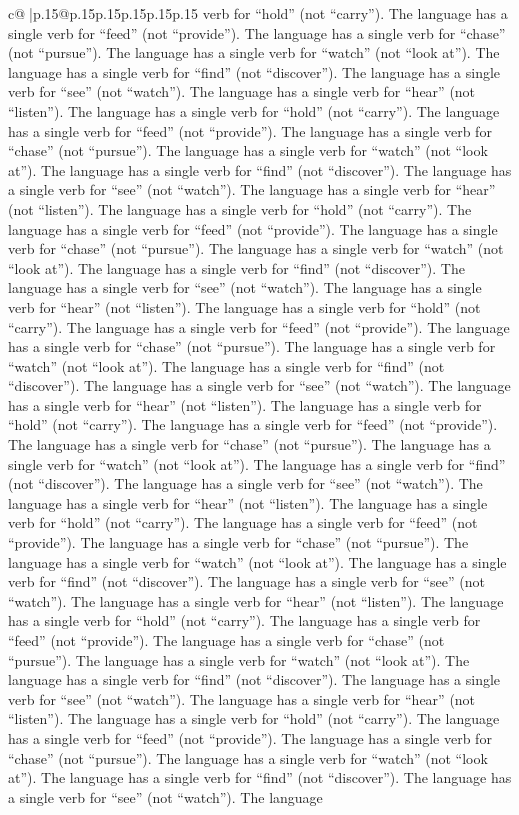\documentclass{article}
\begin{document}
{\begin{supertabular}{c@{$\;$}|p{.15\linewidth}@{}p{.15\linewidth}p{.15\linewidth}p{.15\linewidth}p{.15\linewidth}p{.15\linewidth}}
{{{verb for “hold” (not “carry”). The language has a single verb for “feed” (not “provide”). The language has a single verb for “chase” (not “pursue”). The language has a single verb for “watch” (not “look at”). The language has a single verb for “find” (not “discover”). The language has a single verb for “see” (not “watch”). The language has a single verb for “hear” (not “listen”). The language has a single verb for “hold” (not “carry”). The language has a single verb for “feed” (not “provide”). The language has a single verb for “chase” (not “pursue”). The language has a single verb for “watch” (not “look at”). The language has a single verb for “find” (not “discover”). The language has a single verb for “see” (not “watch”). The language has a single verb for “hear” (not “listen”). The language has a single verb for “hold” (not “carry”). The language has a single verb for “feed” (not “provide”). The language has a single verb for “chase” (not “pursue”). The language has a single verb for “watch” (not “look at”). The language has a single verb for “find” (not “discover”). The language has a single verb for “see” (not “watch”). The language has a single verb for “hear” (not “listen”). The language has a single verb for “hold” (not “carry”). The language has a single verb for “feed” (not “provide”). The language has a single verb for “chase” (not “pursue”). The language has a single verb for “watch” (not “look at”). The language has a single verb for “find” (not “discover”). The language has a single verb for “see” (not “watch”). The language has a single verb for “hear” (not “listen”). The language has a single verb for “hold” (not “carry”). The language has a single verb for “feed” (not “provide”). The language has a single verb for “chase” (not “pursue”). The language has a single verb for “watch” (not “look at”). The language has a single verb for “find” (not “discover”). The language has a single verb for “see” (not “watch”). The language has a single verb for “hear” (not “listen”). The language has a single verb for “hold” (not “carry”). The language has a single verb for “feed” (not “provide”). The language has a single verb for “chase” (not “pursue”). The language has a single verb for “watch” (not “look at”). The language has a single verb for “find” (not “discover”). The language has a single verb for “see” (not “watch”). The language has a single verb for “hear” (not “listen”). The language has a single verb for “hold” (not “carry”). The language has a single verb for “feed” (not “provide”). The language has a single verb for “chase” (not “pursue”). The language has a single verb for “watch” (not “look at”). The language has a single verb for “find” (not “discover”). The language has a single verb for “see” (not “watch”). The language has a single verb for “hear” (not “listen”). The language has a single verb for “hold” (not “carry”). The language has a single verb for “feed” (not “provide”). The language has a single verb for “chase” (not “pursue”). The language has a single verb for “watch” (not “look at”). The language has a single verb for “find” (not “discover”). The language has a single verb for “see” (not “watch”). The language }}}
\end{supertabular}}
\end{document}

